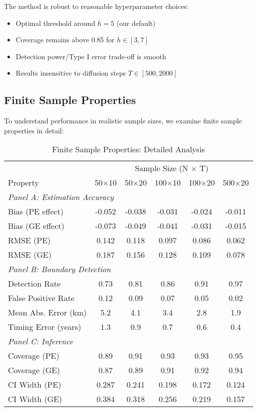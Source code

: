 The method is robust to reasonable hyperparameter choices:
\begin{itemize}
   \item Optimal threshold around $h = 5$ (our default)
   \item Coverage remains above 0.85 for $h \in [3, 7]$
   \item Detection power/Type I error trade-off is smooth
   \item Results insensitive to diffusion steps $T \in [500, 2000]$
\end{itemize}

\subsection{Finite Sample Properties}

To understand performance in realistic sample sizes, we examine finite sample properties in detail:

\begin{table}[H]
\centering
\caption{Finite Sample Properties: Detailed Analysis}
\label{tab:finite_sample}
\begin{tabular}{lccccc}
\toprule
& \multicolumn{5}{c}{Sample Size (N × T)} \\
\cmidrule(lr){2-6}
Property & 50×10 & 50×20 & 100×10 & 100×20 & 500×20 \\
\midrule
\multicolumn{6}{l}{\textit{Panel A: Estimation Accuracy}} \\
Bias (PE effect) & -0.052 & -0.038 & -0.031 & -0.024 & -0.011 \\
Bias (GE effect) & -0.073 & -0.049 & -0.041 & -0.031 & -0.015 \\
RMSE (PE) & 0.142 & 0.118 & 0.097 & 0.086 & 0.062 \\
RMSE (GE) & 0.187 & 0.156 & 0.128 & 0.109 & 0.078 \\
\midrule
\multicolumn{6}{l}{\textit{Panel B: Boundary Detection}} \\
Detection Rate & 0.73 & 0.81 & 0.86 & 0.91 & 0.97 \\
False Positive Rate & 0.12 & 0.09 & 0.07 & 0.05 & 0.02 \\
Mean Abs. Error (km) & 5.2 & 4.1 & 3.4 & 2.8 & 1.9 \\
Timing Error (years) & 1.3 & 0.9 & 0.7 & 0.6 & 0.4 \\
\midrule
\multicolumn{6}{l}{\textit{Panel C: Inference}} \\
Coverage (PE) & 0.89 & 0.91 & 0.93 & 0.93 & 0.95 \\
Coverage (GE) & 0.87 & 0.89 & 0.91 & 0.92 & 0.94 \\
CI Width (PE) & 0.287 & 0.241 & 0.198 & 0.172 & 0.124 \\
CI Width (GE) & 0.384 & 0.318 & 0.256 & 0.219 & 0.157 \\
\bottomrule
\end{tabular}
\end{table}

